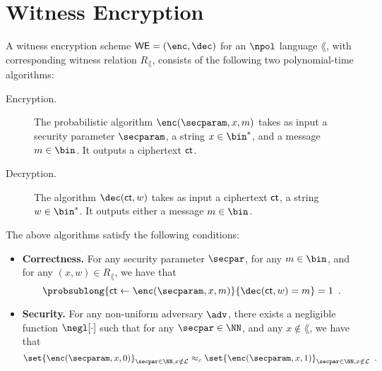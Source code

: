 \section{Witness Encryption}

\begin{definition}
		A witness encryption scheme $\WE = (\enc,\dec)$ for an $\npol$ language $\lang$, with corresponding witness relation $R_\lang$, consists of the following two polynomial-time algorithms:
		
		\begin{description}
			\item[Encryption.] The probabilistic algorithm $\enc(\secparam,x,m)$ takes as input a security parameter $\secparam$, a string $x \in \bin^*$, and a message $m \in \bin$. It outputs a ciphertext $\mathsf{ct}$.
			\item[Decryption.] The algorithm $\dec(\ciphertext,w)$ takes as input a ciphertext $\mathsf{ct}$, a string $w \in \bin^*$. It outputs either a message $m \in \bin$.
		\end{description}
		The above algorithms satisfy the following conditions:
		\begin{itemize}
			\item \textbf{Correctness.} For any security parameter $\secpar$, for any $m \in \bin$, and for any $(x,w) \in R_\lang$, we have that
			\[
				\probsublong{\ciphertext \leftarrow \enc(\secparam,x,m)}{\dec(\ciphertext,w)=m} = 1\enspace.
			\]
			\item \textbf{Security.} For any non-uniform \ppt adversary $\adv$, there exists a negligible function $\negl[\cdot]$ such that for any $\secpar \in \NN$, and any $x \notin \lang$, we have that
			\[
				\set{\enc(\secparam,x,0)}_{\secpar \in \NN, x\notin \lang} \approx_c \set{\enc(\secparam,x,1)}_{\secpar \in \NN, x\notin \lang}\enspace.
			\]
		\end{itemize}
	\end{definition}

